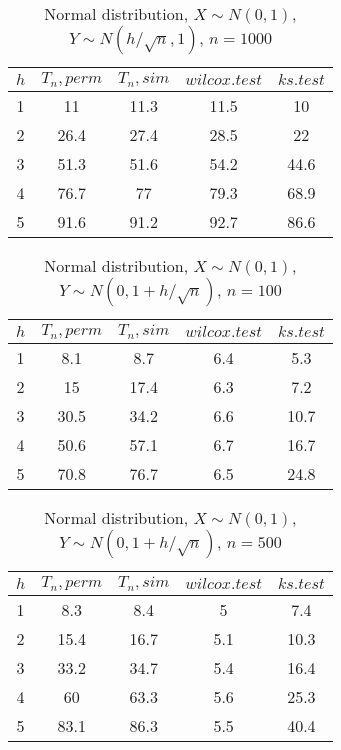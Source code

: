 \documentclass{svproc}
\begin{document}
\begin{table}
  \caption{Normal distribution, $X\sim N(0,1)$, $Y\sim N(h/\sqrt{n},1)$, $n=1000$}
  \begin{center}
  \begin{tabular}{c@{\quad}c@{\quad}c@{\quad}c@{\quad}c}
  \hline
  $h$  & $T_n, perm$ & $T_n, sim$ & $wilcox.test$ & $ks.test$ \\
  \hline
  1 & 11 & 11.3 & 11.5 & 10 \\
  2 & 26.4 & 27.4 & 28.5 & 22 \\
  3 & 51.3 & 51.6 & 54.2 & 44.6 \\
  4 & 76.7 & 77 & 79.3 & 68.9 \\
  5 & 91.6 & 91.2 & 92.7 & 86.6 \\
  \hline
  \end{tabular}
  \end{center}
\end{table}

\begin{table}
  \caption{Normal distribution, $X\sim N(0,1)$, $Y\sim N(0, 1 + h/\sqrt{n})$, $n=100$}
  \begin{center}
  \begin{tabular}{c@{\quad}c@{\quad}c@{\quad}c@{\quad}c}
  \hline
  $h$ & $T_n, perm$ & $T_n, sim$ & $wilcox.test$ & $ks.test$ \\
  \hline
  1 & 8.1 & 8.7 & 6.4 & 5.3 \\
  2 & 15 & 17.4 & 6.3 & 7.2 \\
  3 & 30.5 & 34.2 & 6.6 & 10.7 \\
  4 & 50.6 & 57.1 & 6.7 & 16.7 \\
  5 & 70.8 & 76.7 & 6.5 & 24.8 \\
  \hline
  \end{tabular}
  \end{center}
\end{table}

\begin{table}
  \caption{Normal distribution, $X\sim N(0,1)$, $Y\sim N(0, 1 + h/\sqrt{n})$, $n=500$}
  \begin{center}
  \begin{tabular}{c@{\quad}c@{\quad}c@{\quad}c@{\quad}c}
  \hline
  $h$ & $T_n, perm$ & $T_n, sim$ & $wilcox.test$ & $ks.test$ \\
  \hline
  1 & 8.3 & 8.4 & 5 & 7.4 \\
  2 & 15.4 & 16.7 & 5.1 & 10.3 \\
  3 & 33.2 & 34.7 & 5.4 & 16.4 \\
  4 & 60 & 63.3 & 5.6 & 25.3 \\
  5 & 83.1 & 86.3 & 5.5 & 40.4 \\
  \hline
  \end{tabular}
  \end{center}
\end{table}
\end{document}
